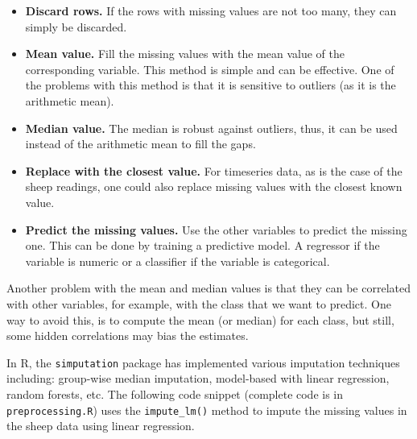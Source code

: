 \documentclass[
  11pt,
]{krantz}
\begin{document}
\begin{itemize}
\item
  \textbf{Discard rows.} If the rows with missing values are not too many, they can simply be discarded.
\item
  \textbf{Mean value.} Fill the missing values with the mean value of the corresponding variable. This method is simple and can be effective. One of the problems with this method is that it is sensitive to outliers (as it is the arithmetic mean).
\item
  \textbf{Median value.} The median is robust against outliers, thus, it can be used instead of the arithmetic mean to fill the gaps.
\item
  \textbf{Replace with the closest value.} For timeseries data, as is the case of the sheep readings, one could also replace missing values with the closest known value.
\item
  \textbf{Predict the missing values.} Use the other variables to predict the missing one. This can be done by training a predictive model. A regressor if the variable is numeric or a classifier if the variable is categorical.
\end{itemize}

Another problem with the mean and median values is that they can be correlated with other variables, for example, with the class that we want to predict. One way to avoid this, is to compute the mean (or median) for each class, but still, some hidden correlations may bias the estimates.

In R, the \texttt{simputation} package \citep{simputation} has implemented various imputation techniques including: group-wise median imputation, model-based with linear regression, random forests, etc. The following code snippet (complete code is in \texttt{preprocessing.R}) uses the \texttt{impute\_lm()} method to impute the missing values in the sheep data using linear regression.
\end{document}
